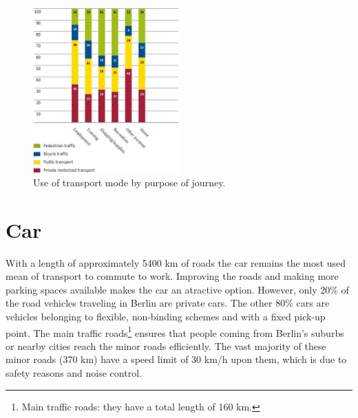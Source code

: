 \begin{figure}
	\includegraphics[width=0.5\textwidth]{MobilityInTheCityJPG/Graphs/UseOfTransportPurpose.jpg}
	\centering
	\caption{Use of transport mode by purpose of journey.\cite{MobilityCity}}
\end{figure}
\section{Car}

With a length of approximately 5400 km of roads the car remains the most used mean of transport to commute to work. Improving the roads and making more parking spaces available makes the car an atractive option. However, only 20\% of the road vehicles traveling in Berlin are private cars. The other 80\% cars are vehicles belonging to flexible, non-binding schemes and with a fixed pick-up point.  The main traffic roads\footnote{Main traffic roads: they have a total length of 160 km.} ensures that people coming from Berlin's suburbs or nearby cities reach the minor roads efficiently. The vast majority of these minor roads (370 km) have a speed limit of 30 km/h upon them, which is due to safety reasons and noise control\cite{MobilityCity}. 

